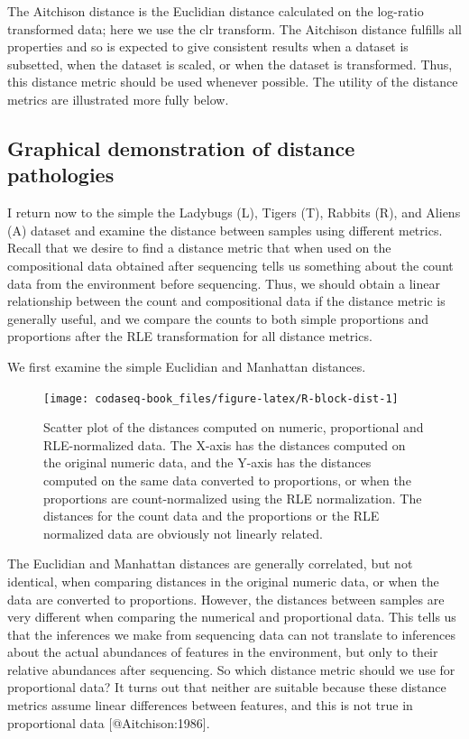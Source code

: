 \documentclass[
  onecolumn]{article}
\begin{document}
The Aitchison distance is the Euclidian distance calculated on the log-ratio transformed data; here we use the clr transform. The Aitchison distance fulfills all properties and so is expected to give consistent results when a dataset is subsetted, when the dataset is scaled, or when the dataset is transformed. Thus, this distance metric should be used whenever possible. The utility of the distance metrics are illustrated more fully below.

\hypertarget{graphical-demonstration-of-distance-pathologies}{%
\subsection{Graphical demonstration of distance pathologies}\label{graphical-demonstration-of-distance-pathologies}}

I return now to the simple the Ladybugs (L), Tigers (T), Rabbits (R), and Aliens (A) dataset and examine the distance between samples using different metrics. Recall that we desire to find a distance metric that when used on the compositional data obtained after sequencing tells us something about the count data from the environment before sequencing. Thus, we should obtain a linear relationship between the count and compositional data if the distance metric is generally useful, and we compare the counts to both simple proportions and proportions after the RLE transformation for all distance metrics.

We first examine the simple Euclidian and Manhattan distances.

\begin{figure}

{\centering \texttt{[image: codaseq-book\_files/figure-latex/R-block-dist-1]} 

}

\caption{Scatter plot of the distances computed on numeric, proportional and RLE-normalized data. The X-axis has the distances computed on the original numeric data, and the Y-axis has the distances computed on the same data converted to proportions, or when the proportions are count-normalized using the RLE normalization. The distances for the count data and the proportions or the RLE normalized data are obviously not linearly related.}\label{fig:R-block-dist}
\end{figure}

The Euclidian and Manhattan distances are generally correlated, but not identical, when comparing distances in the original numeric data, or when the data are converted to proportions. However, the distances between samples are very different when comparing the numerical and proportional data. This tells us that the inferences we make from sequencing data can not translate to inferences about the actual abundances of features in the environment, but only to their relative abundances after sequencing. So which distance metric should we use for proportional data? It turns out that neither are suitable because these distance metrics assume linear differences between features, and this is not true in proportional data {[}@Aitchison:1986{]}.
\end{document}
